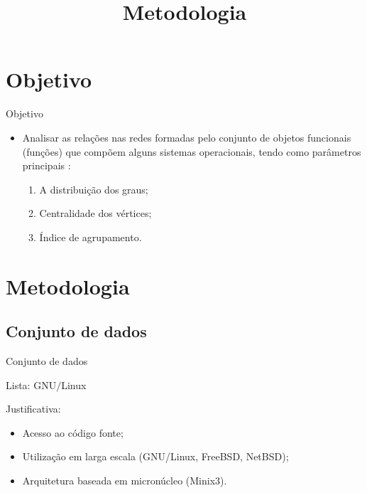 \documentclass[ignorenonframetext]{beamer}
\def\vertex{vértice}
\def\oslist{GNU$/$Linux}
\begin{document}

\section{Objetivo}

\begin{frame}{Objetivo}

\begin{itemize}
\item Analisar as relações nas
redes formadas pelo conjunto de objetos funcionais (funções) que
compõem alguns sistemas operacionais, tendo como parâmetros principais
: 
\begin{enumerate}
\item A distribuição
dos graus; 
\item Centralidade dos \vertex{}s;
\item Índice de agrupamento.
\end{enumerate}
\end{itemize}
\end{frame}

\section{Metodologia}

\begin{frame}[plain]

\title{\LARGE Metodologia}
\author{}
\date{\empty}
\maketitle
\end{frame}

\subsection{Conjunto de dados}

\begin{frame}{Conjunto de dados}
\begin{block}{Lista:}
\oslist
\end{block}

\begin{block}{Justificativa:}
\begin{itemize}
\item Acesso ao código fonte;
\item Utilização em larga escala ({\footnotesize GNU/Linux, FreeBSD, NetBSD});
\item Arquitetura baseada em micronúcleo ({\footnotesize Minix3}).
\end{itemize}
\end{block}

\end{frame}
\end{document}
